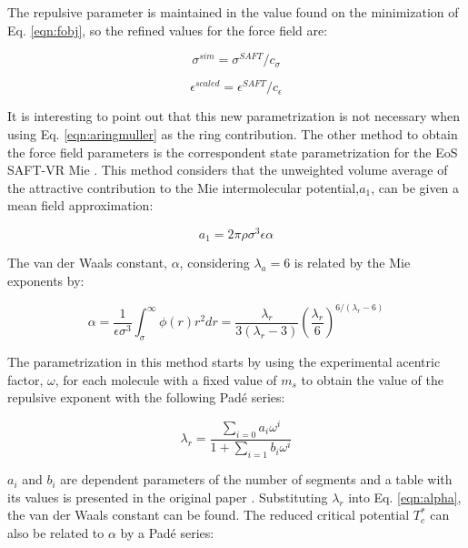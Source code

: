 The repulsive parameter is maintained in the value found on the minimization of Eq. \eqref{eqn:fobj}, so the refined values for the force field are:

\begin{equation}
\sigma^{sim} = \sigma^{SAFT}/c_{\sigma}
\label{eqn:simsigma}
\end{equation}

\begin{equation}
\epsilon^{scaled} = \epsilon^{SAFT}/c_{\epsilon}
\label{eqn:simeps}
\end{equation}

It is interesting to point out that this new parametrization is not necessary when using Eq. \eqref{eqn:aringmuller} as the ring contribution. The other method to obtain the force field parameters is the correspondent state parametrization for the EoS SAFT-VR Mie \cite{mejia2014}. This method considers that the unweighted volume average of the attractive contribution to the Mie intermolecular potential,$a_{1}$, can be given a mean field approximation:

\begin{equation}
a_{1} = 2\pi\rho\sigma^{3}\epsilon\alpha
\label{eqn:a1corres}
\end{equation}

The van der Waals constant, $\alpha$, considering $ \lambda_{a} = 6$ is related by the Mie exponents by:

\begin{equation}
\alpha = \frac{1}{\epsilon\sigma^{3	}} \int_{\sigma}^{\infty} \phi(r)r^{2}dr = \frac{\lambda_{r}}{3(\lambda_{r}-3)}\left(\frac{\lambda_r}{6}\right)^{6/(\lambda_{r} - 6)}  
\label{eqn:alpha}
\end{equation}

The parametrization in this method starts by using the experimental acentric factor, $\omega$, for each molecule with a fixed value of $ m_{s}$ to obtain the value of the repulsive exponent with the following Padé series:

\begin{equation}
\lambda_{r} = \frac{\sum_{i=0} a_{i}\omega^{i}}{1+\sum_{i=1} b_{i}\omega^{i}}   
\label{eqn:lambdaco}
\end{equation}

$a_{i}$ and $b_{i}$ are dependent parameters of the number of segments and a table with its values is presented in the original paper \cite{mejia2014}. Substituting $\lambda_{r}$ into Eq. \eqref{eqn:alpha}, the van der Waals constant can be found. The reduced critical potential $T_{c}^{*}$ can also be related to $\alpha$ by a Padé series: 

